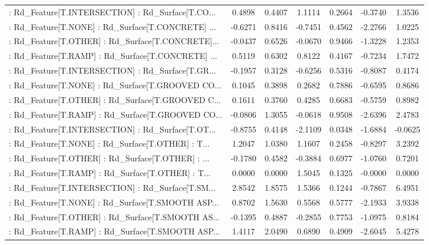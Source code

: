 \begin{longtable}{p{4cm}cccccc}
 : Rd\_Feature[T.INTERSECTION] : Rd\_Surface[T.CO... &  0.4898 &    0.4407 &  1.1114 &       0.2664 & -0.3740 &  1.3536 \\
 : Rd\_Feature[T.NONE] : Rd\_Surface[T.CONCRETE] ... & -0.6271 &    0.8416 & -0.7451 &       0.4562 & -2.2766 &  1.0225 \\
 : Rd\_Feature[T.OTHER] : Rd\_Surface[T.CONCRETE]... & -0.0437 &    0.6526 & -0.0670 &       0.9466 & -1.3228 &  1.2353 \\
 : Rd\_Feature[T.RAMP] : Rd\_Surface[T.CONCRETE] ... &  0.5119 &    0.6302 &  0.8122 &       0.4167 & -0.7234 &  1.7472 \\
 : Rd\_Feature[T.INTERSECTION] : Rd\_Surface[T.GR... & -0.1957 &    0.3128 & -0.6256 &       0.5316 & -0.8087 &  0.4174 \\
 : Rd\_Feature[T.NONE] : Rd\_Surface[T.GROOVED CO... &  0.1045 &    0.3898 &  0.2682 &       0.7886 & -0.6595 &  0.8686 \\
 : Rd\_Feature[T.OTHER] : Rd\_Surface[T.GROOVED C... &  0.1611 &    0.3760 &  0.4285 &       0.6683 & -0.5759 &  0.8982 \\
 : Rd\_Feature[T.RAMP] : Rd\_Surface[T.GROOVED CO... & -0.0806 &    1.3055 & -0.0618 &       0.9508 & -2.6396 &  2.4783 \\
 : Rd\_Feature[T.INTERSECTION] : Rd\_Surface[T.OT... & -0.8755 &    0.4148 & -2.1109 &       0.0348 & -1.6884 & -0.0625 \\
 : Rd\_Feature[T.NONE] : Rd\_Surface[T.OTHER] : T... &  1.2047 &    1.0380 &  1.1607 &       0.2458 & -0.8297 &  3.2392 \\
 : Rd\_Feature[T.OTHER] : Rd\_Surface[T.OTHER] : ... & -0.1780 &    0.4582 & -0.3884 &       0.6977 & -1.0760 &  0.7201 \\
 : Rd\_Feature[T.RAMP] : Rd\_Surface[T.OTHER] : T... &  0.0000 &    0.0000 &  1.5045 &       0.1325 & -0.0000 &  0.0000 \\
 : Rd\_Feature[T.INTERSECTION] : Rd\_Surface[T.SM... &  2.8542 &    1.8575 &  1.5366 &       0.1244 & -0.7867 &  6.4951 \\
 : Rd\_Feature[T.NONE] : Rd\_Surface[T.SMOOTH ASP... &  0.8702 &    1.5630 &  0.5568 &       0.5777 & -2.1933 &  3.9338 \\
 : Rd\_Feature[T.OTHER] : Rd\_Surface[T.SMOOTH AS... & -0.1395 &    0.4887 & -0.2855 &       0.7753 & -1.0975 &  0.8184 \\
 : Rd\_Feature[T.RAMP] : Rd\_Surface[T.SMOOTH ASP... &  1.4117 &    2.0490 &  0.6890 &       0.4909 & -2.6045 &  5.4278 \\

\end{longtable}
